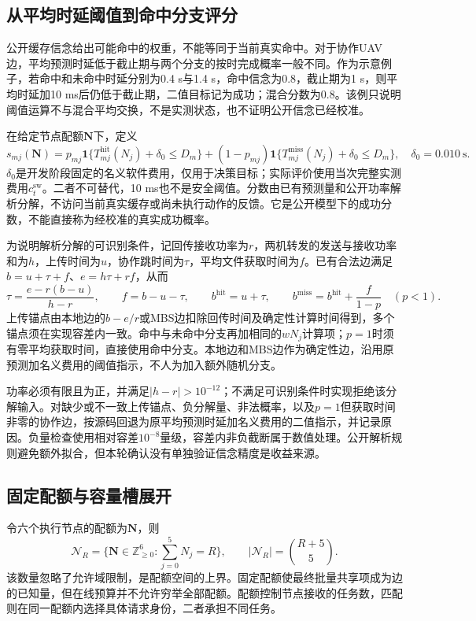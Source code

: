 \subsection{从平均时延阈值到命中分支评分}
公开缓存信念给出可能命中的权重，不能等同于当前真实命中。对于协作UAV边，平均预测时延低于截止期与两个分支的按时完成概率一般不同。作为示意例子，若命中和未命中时延分别为0.4 s与1.4 s，命中信念为0.8，截止期为1 s，则平均时延加10 ms后仍低于截止期，二值目标记为成功；混合分数为0.8。该例只说明阈值运算不与混合平均交换，不是实测状态，也不证明公开信念已经校准。

在给定节点配额$\mathbf N$下，定义
\begin{equation}
 s_{mj}(\mathbf N)=p_{mj}\mathbf1\{T^{\mathrm{hit}}_{mj}(N_j)+\delta_0\le D_m\}
 +(1-p_{mj})\mathbf1\{T^{\mathrm{miss}}_{mj}(N_j)+\delta_0\le D_m\},
 \quad\delta_0=0.010\ \mathrm{s}.
 \label{eq:cost-mixture}
\end{equation}
$\delta_0$是开发阶段固定的名义软件费用，仅用于决策目标；实际评价使用当次完整实测费用$c_t^{\mathrm{sw}}$。二者不可替代，10 ms也不是安全阈值。分数由已有预测量和公开功率解析分解，不访问当前真实缓存或尚未执行动作的反馈。它是公开模型下的成功分数，不能直接称为经校准的真实成功概率。

为说明解析分解的可识别条件，记回传接收功率为$r$，两机转发的发送与接收功率和为$h$，上传时间为$u$，协作跳时间为$\tau$，平均文件获取时间为$f$。已有合法边满足$b=u+\tau+f$、$e=h\tau+rf$，从而
\begin{equation}
 \tau=\frac{e-r(b-u)}{h-r},\qquad
 f=b-u-\tau,\qquad
 b^{\mathrm{hit}}=u+\tau,\qquad
 b^{\mathrm{miss}}=b^{\mathrm{hit}}+\frac{f}{1-p}\quad(p<1).
 \label{eq:cost-decode}
\end{equation}
上传锚点由本地边的$b-e/r$或MBS边扣除回传时间及确定性计算时间得到，多个锚点须在实现容差内一致。命中与未命中分支再加相同的$wN_j$计算项；$p=1$时须有零平均获取时间，直接使用命中分支。本地边和MBS边作为确定性边，沿用原预测加名义费用的阈值指示，不人为加入额外随机分支。

功率必须有限且为正，并满足$|h-r|>10^{-12}$；不满足可识别条件时实现拒绝该分解输入。对缺少或不一致上传锚点、负分解量、非法概率，以及$p=1$但获取时间非零的协作边，按源码回退为原平均预测时延加名义费用的二值指示，并记录原因。负量检查使用相对容差$10^{-8}$量级，容差内非负截断属于数值处理。公开解析规则避免额外拟合，但本轮确认没有单独验证信念精度是收益来源。

\subsection{固定配额与容量槽展开}
令六个执行节点的配额为$\mathbf N$，则
\begin{equation}
 \mathcal N_R=\{\mathbf N\in\mathbb Z_{\ge0}^{6}:\textstyle\sum_{j=0}^{5}N_j=R\},
 \qquad |\mathcal N_R|=\binom{R+5}{5}.
 \label{eq:ch5-quota-space}
\end{equation}
该数量忽略了允许域限制，是配额空间的上界。固定配额使最终批量共享项成为边的已知量，但在线预算并不允许穷举全部配额。配额控制节点接收的任务数，匹配则在同一配额内选择具体请求身份，二者承担不同任务。

